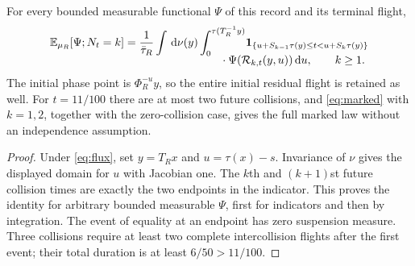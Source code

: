 \begin{proposition}\label{prop:marked}
For every bounded measurable functional $\Psi$ of this record and its terminal flight,
\begin{align}\label{eq:marked}
 \mathbb E_{\mu_R}[\Psi;N_t=k]
 =\frac1{\bar\tau_R}\int\dd\nu(y)\int_0^{\tau(T_R^{-1}y)}
 &\one_{\{u+S_{k-1}\tau(y)\le t<u+S_k\tau(y)\}}\nonumber\\[-2mm]
 &\hspace{-8mm}\cdot\Psi(\mathcal R_{k,t}(y,u))\dd u,\qquad k\ge1.
\end{align}
The initial phase point is $\Phi_R^{-u}y$, so the entire initial residual flight is retained as well. For $t=11/100$ there are at most two future collisions, and \eqref{eq:marked} with $k=1,2$, together with the zero-collision case, gives the full marked law without an independence assumption.
\end{proposition}
\begin{proof}
Under \eqref{eq:flux}, set $y=T_Rx$ and $u=\tau(x)-s$. Invariance of $\nu$ gives the displayed domain for $u$ with Jacobian one. The $k$th and $(k+1)$st future collision times are exactly the two endpoints in the indicator. This proves the identity for arbitrary bounded measurable $\Psi$, first for indicators and then by integration. The event of equality at an endpoint has zero suspension measure. Three collisions require at least two complete intercollision flights after the first event; their total duration is at least $6/50>11/100$.
\end{proof}

